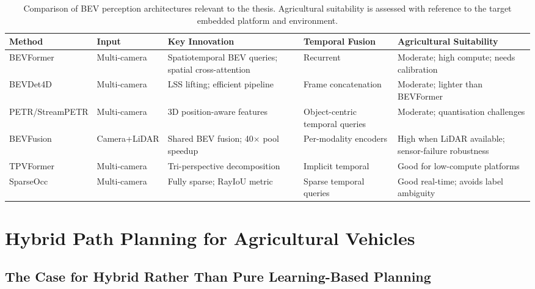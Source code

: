 \documentclass[12pt, a4paper]{article}
\begin{document}
\begin{table}[htbp]
\centering
\caption{Comparison of BEV perception architectures relevant to the thesis. Agricultural suitability is assessed with reference to the target embedded platform and environment.}
\label{tab:bev_comparison}
\begin{tabularx}{\textwidth}{l X X X X}
\toprule
\textbf{Method} & \textbf{Input} & \textbf{Key Innovation} & \textbf{Temporal Fusion} & \textbf{Agricultural Suitability} \\
\midrule
BEVFormer \cite{ref48, ref49} & Multi-camera & Spatiotemporal BEV queries; spatial cross-attention & Recurrent & Moderate; high compute; needs calibration \\
\addlinespace
BEVDet4D \cite{ref7, ref8} & Multi-camera & LSS lifting; efficient pipeline & Frame concatenation & Moderate; lighter than BEVFormer \\
\addlinespace
PETR/StreamPETR \cite{ref66, ref67} & Multi-camera & 3D position-aware features & Object-centric temporal queries & Moderate; quantisation challenges \cite{ref68, ref71} \\
\addlinespace
BEVFusion \cite{ref13, ref18} & Camera+LiDAR & Shared BEV fusion; 40$\times$ pool speedup & Per-modality encoders & High when LiDAR available; sensor-failure robustness \cite{ref63} \\
\addlinespace
TPVFormer \cite{ref9, ref19} & Multi-camera & Tri-perspective decomposition & Implicit temporal & Good for low-compute platforms \\
\addlinespace
SparseOcc \cite{ref24} & Multi-camera & Fully sparse; RayIoU metric & Sparse temporal queries & Good real-time; avoids label ambiguity \\
\bottomrule
\end{tabularx}
\end{table}

\section{Hybrid Path Planning for Agricultural Vehicles}

\subsection{The Case for Hybrid Rather Than Pure Learning-Based Planning}
\end{document}
